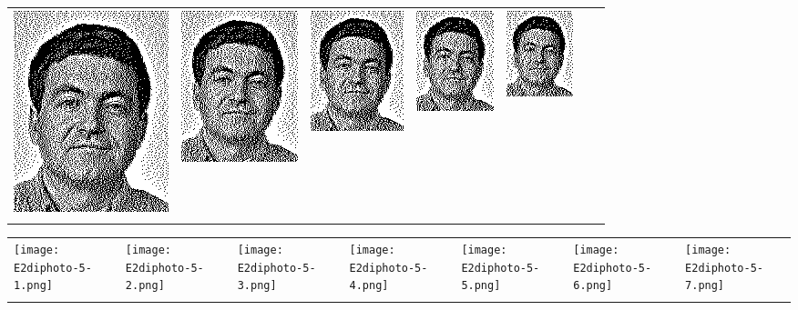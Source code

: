 \begin{tabular}{lllllll}
	\includegraphics{Ediphoto-5-3.png} &
	\includegraphics{Ediphoto-5-4.png} &
	\includegraphics{Ediphoto-5-5.png} &
	\includegraphics{Ediphoto-5-6.png} &
	\includegraphics{Ediphoto-5-7.png} \\
	 &
	 &
	 &
	 &
	 &
	 &
	 \\
\end{tabular}
\begin{tabular}{lllllll}
	\texttt{[image: E2diphoto-5-1.png]} &
	\texttt{[image: E2diphoto-5-2.png]} &
	\texttt{[image: E2diphoto-5-3.png]} &
	\texttt{[image: E2diphoto-5-4.png]} &
	\texttt{[image: E2diphoto-5-5.png]} &
	\texttt{[image: E2diphoto-5-6.png]} &
	\texttt{[image: E2diphoto-5-7.png]} \\
	 &
	 &
	 &
	 &
	 &
	 &
	 \\
\end{tabular}


